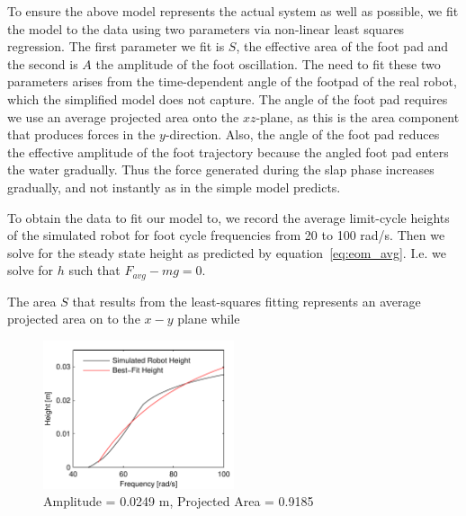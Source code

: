 To ensure the above model represents the actual system as well as possible, we fit the model to the data using two parameters via non-linear least squares regression. The first parameter we fit is $S$, the effective area of the foot pad and the second is $A$ the amplitude of the foot oscillation. The need to fit these two parameters arises from the time-dependent angle of the footpad of the real robot, which the simplified model does not capture. The angle of the foot pad requires we use an average projected area onto the $xz$-plane, as this is the area component that produces forces in the $y$-direction. Also, the angle of the foot pad reduces the effective amplitude of the foot trajectory because the angled foot pad enters the water gradually. Thus the force generated during the slap phase increases gradually, and not instantly as in the simple model predicts.

To obtain the data to fit our model to, we record the average limit-cycle heights of the simulated robot for foot cycle frequencies from 20 to 100 rad/s. Then we solve for the steady state height as predicted by equation~\ref{eq:eom_avg}. I.e. we solve for $h$ such that $F_{avg} - mg = 0$.

The area $S$ that results from the least-squares fitting represents an average projected area on to the $x-y$ plane while 

\begin{figure}[htb]
	\centering
	\includegraphics[width = 0.5\textwidth]{figures/fitheight.pdf}
	\caption{Amplitude = 0.0249 m, Projected Area = 0.9185}
	\label{fig:fitheight}
\end{figure}
